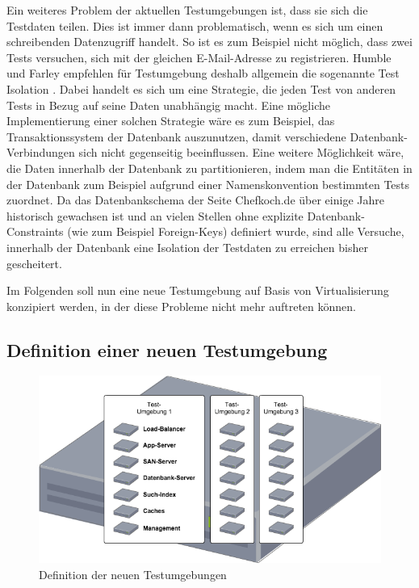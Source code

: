 Ein weiteres Problem der aktuellen Testumgebungen ist, dass sie sich die Testdaten teilen. Dies ist immer dann problematisch, wenn es sich um einen schreibenden Datenzugriff handelt. So ist es zum Beispiel nicht möglich, dass zwei Tests versuchen, sich mit der gleichen E-Mail-Adresse zu registrieren. Humble und Farley empfehlen für Testumgebung deshalb allgemein die sogenannte Test Isolation \citep[Vgl.][S. 337]{HumFar10}. Dabei handelt es sich um eine Strategie, die jeden Test von anderen Tests in Bezug auf seine Daten unabhängig macht. Eine mögliche Implementierung einer solchen Strategie wäre es zum Beispiel, das Transaktionssystem der Datenbank auszunutzen, damit verschiedene Datenbank-Verbindungen sich nicht gegenseitig beeinflussen. Eine weitere Möglichkeit wäre, die Daten innerhalb der Datenbank zu partitionieren, indem man die Entitäten in der Datenbank zum Beispiel aufgrund einer Namenskonvention bestimmten Tests zuordnet. Da das Datenbankschema der Seite Chefkoch.de über einige Jahre historisch gewachsen ist und an vielen Stellen ohne explizite Datenbank-Constraints (wie zum Beispiel Foreign-Keys) definiert wurde, sind alle Versuche, innerhalb der Datenbank eine Isolation der Testdaten zu erreichen bisher gescheitert.

Im Folgenden soll nun eine neue Testumgebung auf Basis von Virtualisierung konzipiert werden, in der diese Probleme nicht mehr auftreten können.

\subsection{Definition einer neuen Testumgebung}

\begin{figure}[!ht]
  \begin{center}
    \includegraphics[width=14cm]{bilder/Untersuchungs-Umgebung.png}
    \caption{Definition der neuen Testumgebungen}
    \label{neue-test}
  \end{center}
\end{figure}


